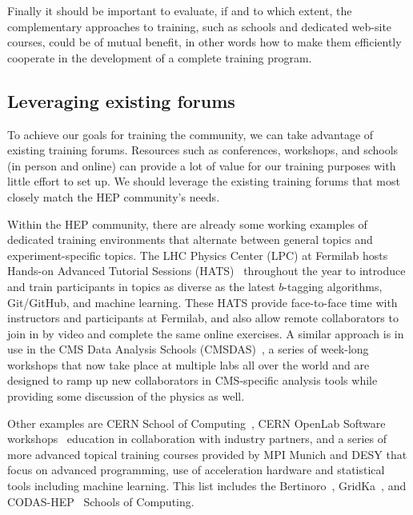 \documentclass[12pt,a4paper]{article}
\begin{document}
Finally it should be important to evaluate, if and to which extent, the
complementary approaches to training, such as schools and dedicated web-site
courses, could be of mutual benefit, in other words how to make them efficiently cooperate in the
development of a complete training program.


\subsection{Leveraging existing forums}

To achieve our goals for training the community, we can take advantage of
existing training forums. Resources such as conferences, workshops, and schools
(in person and online) can provide a lot of value for our training purposes with
little effort to set up. We should leverage the existing training forums that
most closely match the HEP community's needs.

Within the HEP community, there are already some working examples of dedicated
training environments that alternate between general topics and
experiment-specific topics. The LHC Physics Center (LPC) at Fermilab hosts
Hands-on Advanced Tutorial Sessions
(HATS)~\cite{LPCHandsOn}
throughout the year to introduce and train participants in topics as diverse as
the latest $b$-tagging algorithms, Git/GitHub, and machine learning. These HATS
provide face-to-face time with instructors and participants at Fermilab, and
also allow remote collaborators to join in by video and complete the same online
exercises. A similar approach is in use in the CMS Data Analysis Schools
(CMSDAS)~\cite{LPCDataAnalysis},
a series of week-long workshops that now take place at multiple labs all over
the world and are designed to ramp up new collaborators in CMS-specific analysis
tools while providing some discussion of the physics as well.

Other examples are CERN School of Computing~\cite{CERNSchoolOfComputing}, 
CERN OpenLab Software workshops~\cite{OPENLab} education in collaboration with
industry partners, and a series of more advanced topical training courses
provided by MPI Munich and DESY that focus on advanced programming, use of
acceleration hardware and statistical tools including machine learning. This
list includes the
Bertinoro~\cite{Bertinoro}, 
GridKa~\cite{GridKa}, and
CODAS-HEP~\cite{CODAS-HEP} Schools of Computing.
\end{document}
